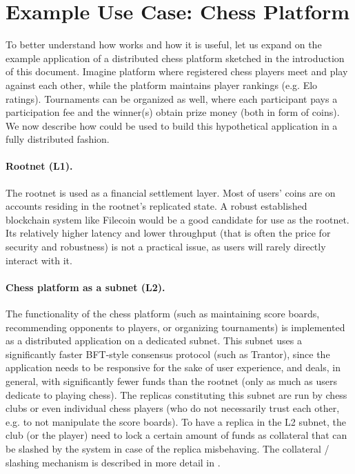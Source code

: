 \section{Example Use Case: Chess Platform}
\label{sec:example-use-case}

To better understand how \ipc works and how it is useful, let us expand on the example application of a distributed chess platform sketched in the introduction of this document.
Imagine platform where registered chess players meet and play against each other, while the platform maintains player rankings (e.g. Elo ratings).
Tournaments can be organized as well, where each participant pays a participation fee and the winner(s) obtain prize money (both in form of coins).
We now describe how \ipc could be used to build this hypothetical application in a fully distributed fashion.

\paragraph{Rootnet (L1).}
The rootnet is used as a financial settlement layer.
Most of users' coins are on accounts residing in the rootnet's replicated state.
A robust established blockchain system like Filecoin would be a good candidate for use as the rootnet.
Its relatively higher latency and lower throughput (that is often the price for security and robustness) is not a practical issue,
as users will rarely directly interact with it.

\paragraph{Chess platform as a subnet (L2).}
The functionality of the chess platform
(such as maintaining score boards, recommending opponents to players, or organizing tournaments)
is implemented as a distributed application on a dedicated subnet.
This subnet uses a significantly faster BFT-style consensus protocol (such as Trantor),
since the application needs to be responsive for the sake of user experience,
and deals, in general, with significantly fewer funds than the rootnet (only as much as users dedicate to playing chess).
The replicas constituting this subnet are run by chess clubs or even individual chess players (who do not necessarily trust each other, e.g. to not manipulate the score boards).
To have a replica in the L2 subnet, the club (or the player) need to lock a certain amount of funds as collateral that can be slashed by the system in case of the replica misbehaving.
The collateral / slashing mechanism is described in more detail in .


